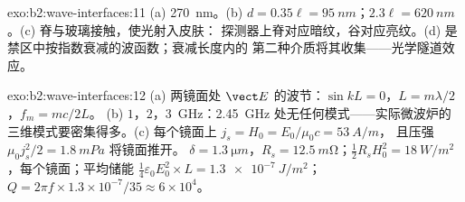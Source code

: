 \begin{solution}{exo:b2:wave-interfaces:11}
(a) \qty{270}{nm}。(b) $d = 0.35\ell = \qty{95}{nm}$；$2.3\ell = \qty{620}{nm}$。(c)
脊与玻璃接触，使光射入皮肤：
探测器上脊对应暗纹，谷对应亮纹。(d) 是
禁区中按指数衰减的波函数；衰减长度内的
第二种介质将其收集——光学隧道效应。
\end{solution}

\begin{solution}{exo:b2:wave-interfaces:12}
(a) 两镜面处 $\vect E$ 的波节：$\sin kL = 0$，$L = m\lambda/2$，$f_m = mc/2L$。
(b) $1$，$2$，\qty{3}{GHz}：\qty{2.45}{GHz} 处无任何模式——实际微波炉的
三维模式要密集得多。(c) 每个镜面上 $j_s = H_0 = E_0/\mu_0c = \qty{53}{A/m}$，
且压强 $\mu_0j_s^2/2 = \qty{1.8}{mPa}$ 将镜面推开。
$\delta = \qty{1.3}{\micro m}$，$R_s = \qty{12.5}{m\ohm}$；$\tfrac12R_sH_0^2 =
\qty{18}{W/m^2}$，每个镜面；平均储能 $\tfrac14\varepsilon_0E_0^2 \times L = \qty{1.3e-7}{J/m^2}$；
$Q = 2\pi f \times 1.3 \times 10^{-7}/35 \approx 6 \times 10^4$。
\end{solution}

